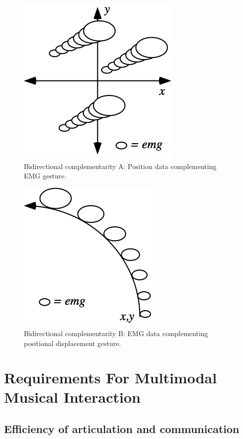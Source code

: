   \begin{figure}[!htbp]
  \centering
  \includegraphics[scale=1]{figures/bidirectionalA.png}
  \caption{Bidirectional complementarity A: Position data complementing EMG gesture.}
  \label{Tanaka:fig:bidirectionalA}
\end{figure}

  \begin{figure}[!htbp]
  \centering
  \includegraphics[scale=1]{figures/bidirectionalB.png}
  \caption{Bidirectional complementarity B: EMG data complementing positional displacement gesture.}
  \label{Tanaka:fig:bidirectionalB}
\end{figure}
 
\section{Requirements For Multimodal Musical Interaction}


\subsection{Efficiency of articulation and communication}


